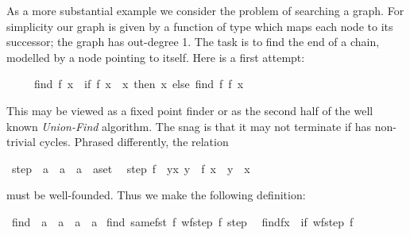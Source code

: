 \begin{isabellebody}
\begin{isamarkuptext}
As a more substantial example we consider the problem of searching a graph.
For simplicity our graph is given by a function  of
type  which
maps each node to its successor; the graph has out-degree 1.
The task is to find the end of a chain, modelled by a node pointing to
itself. Here is a first attempt:
\begin{isabelle}%
\ \ \ \ \ find\ {\isacharparenleft}f{\isacharcomma}\ x{\isacharparenright}\ {\isacharequal}\ {\isacharparenleft}if\ f\ x\ {\isacharequal}\ x\ then\ x\ else\ find\ {\isacharparenleft}f{\isacharcomma}\ f\ x{\isacharparenright}{\isacharparenright}%
\end{isabelle}
This may be viewed as a fixed point finder or as the second half of the well
known \emph{Union-Find} algorithm.
The snag is that it may not terminate if  has non-trivial cycles.
Phrased differently, the relation%
\end{isamarkuptext}%
\isamarkuptrue%
\isamarkupfalse%
\ step{}\ {\isacharcolon}{\isacharcolon}\ {\isachardoublequoteopen}{\isacharparenleft}{\isacharprime}a\ {\isasymRightarrow}\ {\isacharprime}a{\isacharparenright}\ {\isasymRightarrow}\ {\isacharparenleft}{\isacharprime}a\ {\isasymtimes}\ {\isacharprime}a{\isacharparenright}set{\isachardoublequoteclose}\isanewline
\ \ {\isachardoublequoteopen}step{}\ f\ {\isasymequiv}\ {\isacharbraceleft}{\isacharparenleft}y{\isacharcomma}x{\isacharparenright}{\isachardot}\ y\ {\isacharequal}\ f\ x\ {\isasymand}\ y\ {\isasymnoteq}\ x{\isacharbraceright}{\isachardoublequoteclose}%
\begin{isamarkuptext}%
\noindent
must be well-founded. Thus we make the following definition:%
\end{isamarkuptext}%
\isamarkuptrue%
\isamarkupfalse%
\ find\ {\isacharcolon}{\isacharcolon}\ {\isachardoublequoteopen}{\isacharparenleft}{\isacharprime}a\ {\isasymRightarrow}\ {\isacharprime}a{\isacharparenright}\ {\isasymtimes}\ {\isacharprime}a\ {\isasymRightarrow}\ {\isacharprime}a{\isachardoublequoteclose}\isanewline
{}\isamarkupfalse%
\ find\ {\isachardoublequoteopen}same{\isacharunderscore}fst\ {\isacharparenleft}{\isasymlambda}f{\isachardot}\ wf{\isacharparenleft}step{}\ f{\isacharparenright}{\isacharparenright}\ step{}{\isachardoublequoteclose}\isanewline
\ \ {\isachardoublequoteopen}find{\isacharparenleft}f{\isacharcomma}x{\isacharparenright}\ {\isacharequal}\ {\isacharparenleft}if\ wf{\isacharparenleft}step{}\ f{\isacharparenright}\isanewline

\end{isabellebody}
